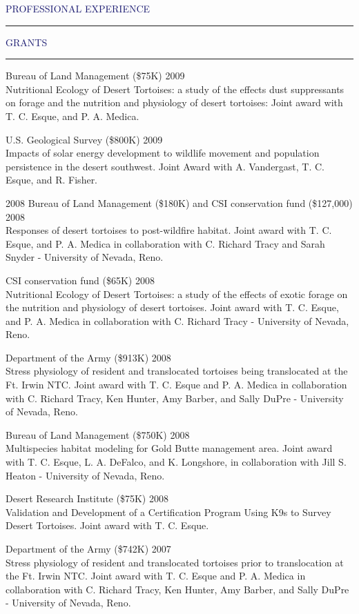 \documentclass{resume} %
\renewenvironment{rSection}[1]{
\sectionskip
\textcolor{MidnightBlue}{\MakeUppercase{#1}}
\sectionlineskip
\hrule
\begin{list}{}{
\setlength{\leftmargin}{1.5em}
}
\item[]
}{
\end{list}
}
\begin{document}
\begin{rSection}{Professional Experience}
\begin{rSection}{Grants}{}
\item Bureau of Land Management (\$75K) \hfill 2009 \\ 
Nutritional Ecology of Desert Tortoises: a study of the effects dust suppressants on forage and the nutrition and physiology of desert tortoises: Joint award with T. C. Esque, and P. A. Medica.
\item U.S. Geological Survey (\$800K) \hfill 2009 \\ 
Impacts of solar energy development to wildlife movement and population persistence in the desert southwest. Joint Award with A. Vandergast, T. C. Esque, and R. Fisher.
\item 2008	Bureau of Land Management (\$180K) and CSI conservation fund (\$127,000)  \hfill 2008 \\ 
Responses of desert tortoises to post-wildfire habitat. Joint award with T. C. Esque, and P. A. Medica in collaboration with C. Richard Tracy and Sarah Snyder - University of Nevada, Reno.
\item CSI conservation fund (\$65K) \hfill 2008 \\ 
Nutritional Ecology of Desert Tortoises: a study of the effects of exotic forage on the nutrition and physiology of desert tortoises. Joint award with T. C. Esque, and P. A. Medica in collaboration with C. Richard Tracy - University of Nevada, Reno.
\item Department of the Army (\$913K) \hfill 2008 \\ 
Stress physiology of resident and translocated tortoises being translocated at the Ft. Irwin NTC. Joint award with T. C. Esque and P. A. Medica in collaboration with C. Richard Tracy, Ken Hunter, Amy Barber, and Sally DuPre - University of Nevada, Reno.
\item Bureau of Land Management (\$750K) \hfill 2008 \\ 
Multispecies habitat modeling for Gold Butte management area. Joint award with T. C. Esque, L. A. DeFalco, and K. Longshore, in collaboration with Jill S. Heaton - University of Nevada, Reno.
\item Desert Research Institute (\$75K) \hfill 2008 \\ 
Validation and Development of a Certification Program Using K9s to Survey Desert Tortoises. Joint award with T. C. Esque.
\item Department of the Army (\$742K) \hfill 2007 \\ 
Stress physiology of resident and translocated tortoises prior to translocation at the Ft. Irwin NTC. Joint award with T. C. Esque and P. A. Medica in collaboration with C. Richard Tracy, Ken Hunter, Amy Barber, and Sally DuPre - University of Nevada, Reno.

\end{rSection}
\end{rSection}
\end{document}
